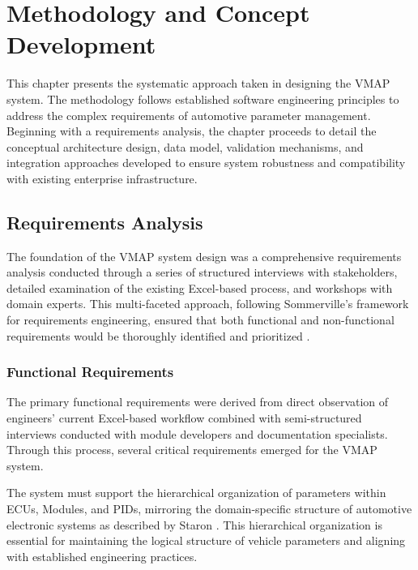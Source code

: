\chapter{Methodology and Concept Development}
\label{chap:methodology}

This chapter presents the systematic approach taken in designing the \ac{VMAP} system. The methodology follows established software engineering principles to address the complex requirements of automotive parameter management. Beginning with a requirements analysis, the chapter proceeds to detail the conceptual architecture design, data model, validation mechanisms, and integration approaches developed to ensure system robustness and compatibility with existing enterprise infrastructure.

\section{Requirements Analysis}
\label{sec:requirements-analysis}

The foundation of the \ac{VMAP} system design was a comprehensive requirements \mbox{analysis} conducted through a series of structured interviews with stakeholders, detailed examination of the existing Excel-based process, and workshops with domain experts. This multi-faceted approach, following Sommerville's framework for requirements engineering, ensured that both functional and non-functional requirements would be thoroughly identified and prioritized \cite{sommerville2011software}.

\subsection{Functional Requirements}
\label{subsec:functional-requirements}

The primary functional requirements were derived from direct observation of engineers' current Excel-based workflow combined with semi-structured interviews conducted with module developers and documentation specialists. Through this process, several critical requirements emerged for the \ac{VMAP} system.

The system must support the hierarchical organization of parameters within \acp{ECU}, Modules, and \acp{PID}, mirroring the domain-specific structure of automotive electronic systems as described by Staron \cite{staron2021automotive}. This hierarchical organization is essential for maintaining the logical structure of vehicle parameters and aligning with established engineering practices.

